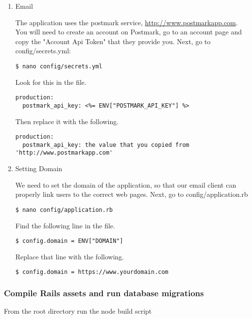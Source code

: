 \documentclass[11pt]{article}
\begin{document}
\begin{enumerate}
\item Email
\label{sec:org1840f9d}

The application uses the postmark service, \url{http://www.postmarkapp.com}. You will need to create an account on Postmark, go to an account page and copy the "Account Api Token" that they provide you.
Next, go to config/secrets.yml:

\begin{verbatim}
$ nano config/secrets.yml
\end{verbatim}

Look for this in the file.

\begin{verbatim}
production:
  postmark_api_key: <%= ENV["POSTMARK_API_KEY"] %>
\end{verbatim}

Then replace it with the following.

\begin{verbatim}
production:
  postmark_api_key: the value that you copied from 'http://www.postmarkapp.com'
\end{verbatim}


\item Setting Domain
\label{sec:orgc2c43d1}

We need to set the domain of the application, so that our email client can properly link users to the correct web pages.
Next, go to config/application.rb
\begin{verbatim}
$ nano config/application.rb
\end{verbatim}

Find the following line in the file.

\begin{verbatim}
$ config.domain = ENV["DOMAIN"]
\end{verbatim}

Replace that line with the following.

\begin{verbatim}
$ config.domain = https://www.yourdomain.com
\end{verbatim}
\end{enumerate}

\subsubsection{Compile Rails assets and run database migrations}
\label{sec:org64b621d}

From the root directory run the node build script
\end{document}
